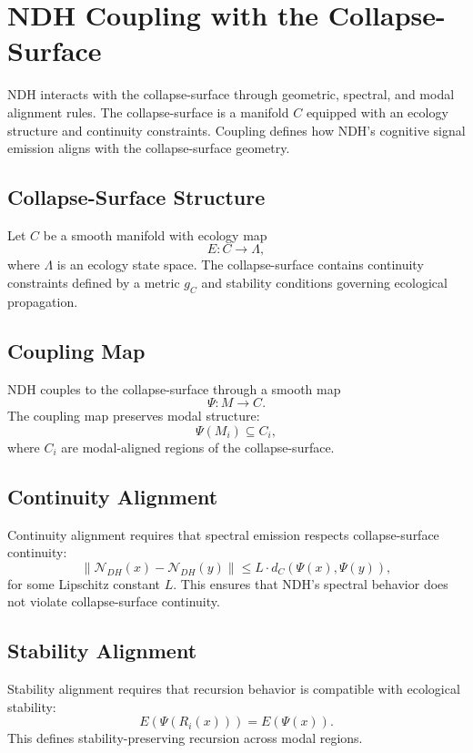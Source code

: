 \section{NDH Coupling with the Collapse-Surface}
\label{sec:ndh-collapse-coupling}

NDH interacts with the collapse-surface through geometric, spectral, and modal
alignment rules. The collapse-surface is a manifold $C$ equipped with an ecology
structure and continuity constraints. Coupling defines how NDH's cognitive signal
emission aligns with the collapse-surface geometry.

\subsection{Collapse-Surface Structure}

Let $C$ be a smooth manifold with ecology map
\[
E : C \to \Lambda,
\]
where $\Lambda$ is an ecology state space. The collapse-surface contains
continuity constraints defined by a metric $g_C$ and stability conditions
governing ecological propagation.

\subsection{Coupling Map}

NDH couples to the collapse-surface through a smooth map
\[
\Psi : M \to C.
\]
The coupling map preserves modal structure:
\[
\Psi(M_i) \subseteq C_i,
\]
where $C_i$ are modal-aligned regions of the collapse-surface.

\subsection{Continuity Alignment}

Continuity alignment requires that spectral emission respects collapse-surface
continuity:
\[
\|\mathcal{N}_{DH}(x) - \mathcal{N}_{DH}(y)\|
  \le L \cdot d_C(\Psi(x), \Psi(y)),
\]
for some Lipschitz constant $L$. This ensures that NDH's spectral behavior does
not violate collapse-surface continuity.

\subsection{Stability Alignment}

Stability alignment requires that recursion behavior is compatible with
ecological stability:
\[
E(\Psi(R_i(x))) = E(\Psi(x)).
\]
This defines stability-preserving recursion across modal regions.

